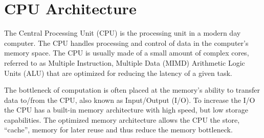\section{CPU Architecture}
\label{sec:cpu}
The Central Processing Unit (CPU) is the processing unit in a modern day computer.
The CPU handles processing and control of data in the computer's memory space.
The CPU is usually made of a small amount of complex cores, referred to as Multiple Instruction, Multiple Data (MIMD) Arithmetic Logic Units (ALU) that are optimized for reducing the latency of a given task.

The bottleneck of computation is often placed at the memory's ability to transfer data to/from the CPU, also known as Input/Output (I/O).
To increase the I/O the CPU has a built-in memory architecture with high speed, but low storage capabilities.
The optimized memory architecture allows the CPU the store, ``cache'', memory for later reuse and thus reduce the memory bottleneck.~\cite{bryant2003computer}
